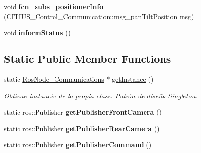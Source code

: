 \begin{DoxyCompactItemize}
\item 
\hypertarget{class_ros_node___communications_a0d36b6b380fabae45b25eceff0df7de4}{void {\bfseries fcn\-\_\-subs\-\_\-positioner\-Info} (\-C\-I\-T\-I\-U\-S\-\_\-\-Control\-\_\-\-Communication\-::msg\-\_\-pan\-Tilt\-Position msg)}\label{class_ros_node___communications_a0d36b6b380fabae45b25eceff0df7de4}

\item 
\hypertarget{class_ros_node___communications_ac25d7b9ff07d13f771290bd8d13dae5f}{void {\bfseries inform\-Status} ()}\label{class_ros_node___communications_ac25d7b9ff07d13f771290bd8d13dae5f}

\end{DoxyCompactItemize}
\subsection*{\-Static \-Public \-Member \-Functions}
\begin{DoxyCompactItemize}
\item 
static \hyperlink{class_ros_node___communications}{\-Ros\-Node\-\_\-\-Communications} $\ast$ \hyperlink{class_ros_node___communications_a24ba6db36ccf6ff2b4f696ecc5435862}{get\-Instance} ()
\begin{DoxyCompactList}\small\item\em \-Obtiene instancia de la propia clase. \-Patrón de diseño \-Singleton. \end{DoxyCompactList}\item 
\hypertarget{class_ros_node___communications_a4c9173cc6eefe1f423b704bf57d1b923}{static ros\-::\-Publisher {\bfseries get\-Publisher\-Front\-Camera} ()}\label{class_ros_node___communications_a4c9173cc6eefe1f423b704bf57d1b923}

\item 
\hypertarget{class_ros_node___communications_ae9e1a99f54c937b012671737235e4d6e}{static ros\-::\-Publisher {\bfseries get\-Publisher\-Rear\-Camera} ()}\label{class_ros_node___communications_ae9e1a99f54c937b012671737235e4d6e}

\item 
\hypertarget{class_ros_node___communications_a92a4ba971797bd9841b9adb316cd0e1b}{static ros\-::\-Publisher {\bfseries get\-Publisher\-Command} ()}\label{class_ros_node___communications_a92a4ba971797bd9841b9adb316cd0e1b}

\end{DoxyCompactItemize}
